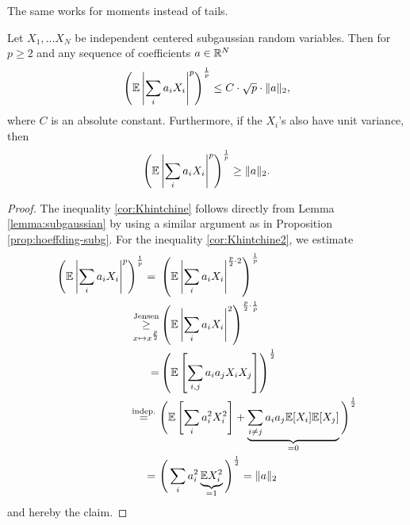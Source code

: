 The same works for moments instead of tails.
\begin{corollary} 
\begin{mdframed} 
Let $X_1,...X_N$ be independent centered subgaussian random variables. Then for $p\geq 2$ and any sequence of coefficients $a\in\mathbb{R}^N$
\begin{equation}\label{cor:Khintchine}
\left(\mathbb{E}\left|\sum_i a_iX_i\right|^p\right)^{\frac{1}{p}} \leq C \cdot \sqrt{p} \cdot \|a\|_2,
\end{equation}
where $C$ is an absolute constant. Furthermore, if the $X_i$'s also have unit variance, then
\begin{equation}\label{cor:Khintchine2}
\left(
\mathbb{E} \left| \sum_i a_iX_i \right|^p
\right)^\frac{1}{p} \geq \|a\|_2.
\end{equation}
\end{mdframed}
\begin{proof}
The inequality \eqref{cor:Khintchine} follows directly from Lemma \ref{lemma:subgaussian} by using a similar argument as in Proposition \ref{prop:hoeffding-subg}. For the inequality \eqref{cor:Khintchine2}, we estimate
\begin{equation*}
\begin{split}
\left(
\mathbb{E} \left| \sum_i a_i X_i \right|^p
\right)^{\frac{1}{p}} = \  & \left(
\mathbb{E} \left| \sum_i a_i X_i \right|^{\frac{p}{2}\cdot 2}
\right)^{\frac{1}{p}} \\
\underset{x\mapsto x^{\frac{p}{2}}}{\overset{\text{Jensen}}{\geq}}   & \left(\mathbb{E} \left| \sum_i a_iX_i\right|^2\right)^{\frac{p}{2}\cdot \frac{1}{p}} \\
=  & \left(\mathbb{E} \left[ \sum_{i,j} a_ia_jX_iX_j\right]\right)^{\frac{1}{2}} \\
\overset{\text{indep.}}{=}\ & \Bigg(\mathbb{E}\left[\sum_i a_i^2 X_i^2\right] + \underbrace{\sum_{i\neq j} a_ia_j \mathbb{E}[X_i]\mathbb{E}[X_j]}_{=0}	\Bigg)^{\frac{1}{2}} \\
= \ & \Bigg( \sum_i a_i^2 \underbrace{\mathbb{E} X_i^2}_{=1} \Bigg)^\frac{1}{2} = \|a\|_2
\end{split}
\end{equation*}
and hereby the claim.
\end{proof}
\end{corollary}
